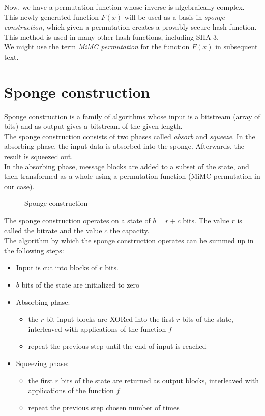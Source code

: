 \documentclass[letterpaper, bothsides, 12pt]{article} %
\begin{document}
Now, we have a permutation function whose inverse is algebraically complex. This newly generated function $F(x)$ will be used as a basis in \textit{sponge construction}, which given a permutation creates a provably secure hash function. This method is used in many other hash functions, including SHA-3. \\

We might use the term \textit{MiMC permutation} for the function $F(x)$ in subsequent text.

\section{Sponge construction}
Sponge construction is a family of algorithms whose input is a bitstream (array of bits) and as output gives a bitstream of the given length. \\

The sponge construction consists of two phases called \textit{absorb} and \textit{squeeze}. In the absorbing phase, the input data is absorbed into the sponge. Afterwards, the result is squeezed out. \\

In the absorbing phase, message blocks are added to a subset of the state, and then transformed as a whole using a permutation function (MiMC permutation in our case).

\begin{figure}[htbp]
  \centering
  
  \caption{Sponge construction}
\end{figure}

The sponge construction operates on a state of $b=r+c$ bits. The value $r$ is called the bitrate and the value $c$ the capacity. \\

The algorithm by which the sponge construction operates can be summed up in the following steps: 
\begin{itemize}
    \item Input is cut into blocks of $r$ bits.
    \item $b$ bits of the state are initialized to zero
    \item Absorbing phase: 
        \begin{itemize}
            \item the $r$-bit input blocks are XORed into the first $r$ bits of the state, interleaved with applications of the function $f$
            \item repeat the previous step until the end of input is reached
        \end{itemize}
    \item Squeezing phase: 
        \begin{itemize}
            \item the first $r$ bits of the state are returned as output blocks, interleaved with applications of the function $f$
            \item repeat the previous step chosen number of times
        \end{itemize}
\end{itemize}
\end{document}
